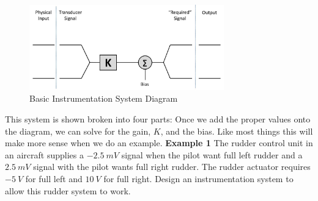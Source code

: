 \documentclass{handout}
\begin{document}
\begin{figure} [h!]
\centering
\includegraphics[width=0.75\textwidth]{InstrumentationSystem.jpg}
\caption{Basic Instrumentation System Diagram}
\label{fig: InstrumentationSystem}
\end{figure}
This system is shown broken into four parts:  
Once we add the proper values onto the diagram, we can solve for the gain, $K$, and the bias.  Like most things this will make more sense when we do an example.
\newpage
\clearpage
\pagebreak
\textbf{Example 1}
The rudder control unit in an aircraft supplies a $-2.5\ mV$ signal when the pilot want full left rudder and a $2.5\ mV$ signal with the pilot wants full right rudder.  The rudder actuator requires $-5\ V$ for full left and $10\ V$ for full right.  Design an instrumentation system to allow this rudder system to work.
\end{document}
